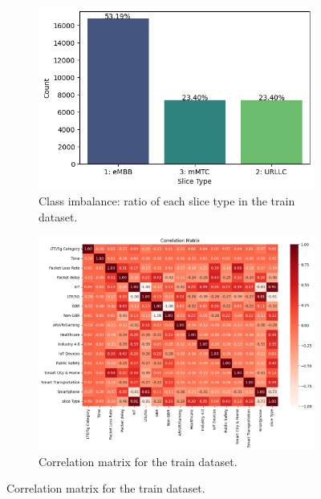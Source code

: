 \documentclass[conference]{IEEEtran}
\begin{document}
\begin{figure}[!t]
    \centering
    \begin{subfigure}[b]{0.425\columnwidth}
        \centering
        \includegraphics[width=\columnwidth]{class-imbalance.png}
        \caption{Class imbalance: ratio of each slice type in the train dataset.}
        \label{fig:class-imbalance}
    \end{subfigure}
    \hfill
    \begin{subfigure}[b]{0.562\columnwidth}
        \centering
        \includegraphics[width=\columnwidth]{eda-plot-slice-type-red.png}
        \caption{Correlation matrix for the train dataset.}
        \label{fig:eda-plot-slice-type}
    \end{subfigure}


\end{figure}
\end{document}
